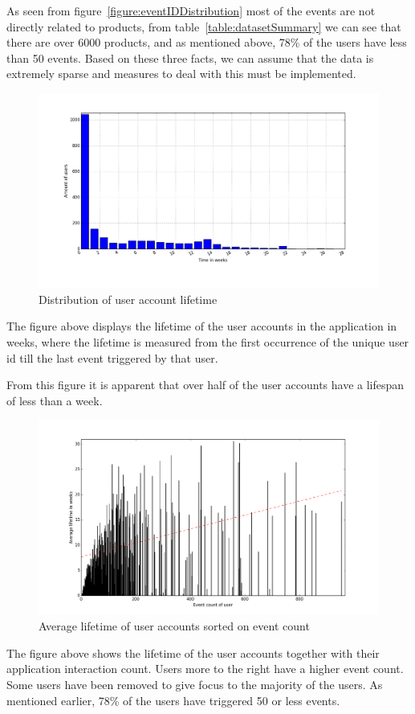         As seen from figure~\ref{figure:eventIDDistribution} most of the events are not directly related to products, from table~\ref{table:datasetSummary} we can see that there are over 6000 products, and as mentioned above, 78\% of the users have less than 50 events. Based on these three facts, we can assume that the data is extremely sparse and measures to deal with this must be implemented.

    \begin{figure}[H]
        \includegraphics[width=5in]{image/userTimespansdistribution.png}
        \centering
        \caption{Distribution of user account lifetime}
    \label{figure:userTimespandist}
    \end{figure}
        The figure above displays the lifetime of the user accounts in the application in weeks, where the lifetime is measured from the first occurrence of the unique user id till the last event triggered by that user.

        From this figure it is apparent that over half of the user accounts have a lifespan of less than a week.

    \begin{figure}[H]
        \includegraphics[width=5in]{image/avglifetimeoncountuser.png}
        \centering
        \caption{Average lifetime of user accounts sorted on event count}
    \label{figure:avglifetimeoncountuser}
    \end{figure}
        The figure above shows the lifetime of the user accounts together with their application interaction count.
        Users more to the right have a higher event count.
        Some users have been removed to give focus to the majority of the users. As mentioned earlier, 78\% of the users have triggered 50 or less events.

